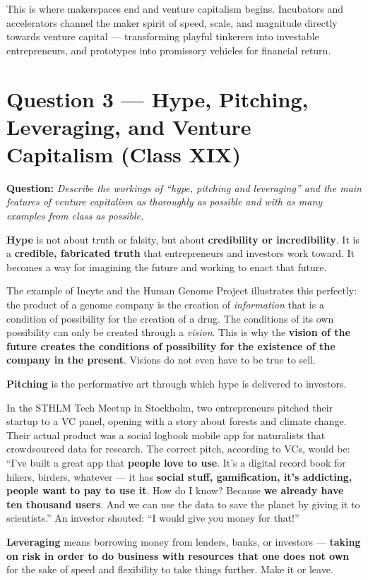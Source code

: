 \documentclass[11pt,a4paper]{article}
\begin{document}
This is where makerspaces end and venture capitalism begins. Incubators and accelerators channel the maker spirit of speed, scale, and magnitude directly towards venture capital --- transforming playful tinkerers into investable entrepreneurs, and prototypes into promissory vehicles for financial return.

\section*{Question 3 --- Hype, Pitching, Leveraging, and Venture Capitalism (Class XIX)}

\textbf{Question:} \textit{Describe the workings of ``hype, pitching and leveraging'' and the main features of venture capitalism as thoroughly as possible and with as many examples from class as possible.}

\textbf{Hype} is not about truth or falsity, but about \textbf{credibility or incredibility}. It is a \textbf{credible, fabricated truth} that entrepreneurs and investors work toward. It becomes a way for imagining the future and working to enact that future.

The example of Incyte and the Human Genome Project illustrates this perfectly: the product of a genome company is the creation of \textit{information} that is a condition of possibility for the creation of a drug. The conditions of its own possibility can only be created through a \textit{vision}. This is why the \textbf{vision of the future creates the conditions of possibility for the existence of the company in the present}. Visions do not even have to be true to sell.

\textbf{Pitching} is the performative art through which hype is delivered to investors.

In the STHLM Tech Meetup in Stockholm, two entrepreneurs pitched their startup to a VC panel, opening with a story about forests and climate change. Their actual product was a social logbook mobile app for naturalists that crowdsourced data for research. The correct pitch, according to VCs, would be: ``I've built a great app that \textbf{people love to use}. It's a digital record book for hikers, birders, whatever --- it has \textbf{social stuff, gamification, it's addicting, people want to pay to use it}. How do I know? Because \textbf{we already have ten thousand users}. And we can use the data to save the planet by giving it to scientists.'' An investor shouted: ``I would give you money for that!''

\textbf{Leveraging} means borrowing money from lenders, banks, or investors --- \textbf{taking on risk in order to do business with resources that one does not own} for the sake of speed and flexibility to take things further. Make it or leave.
\end{document}
